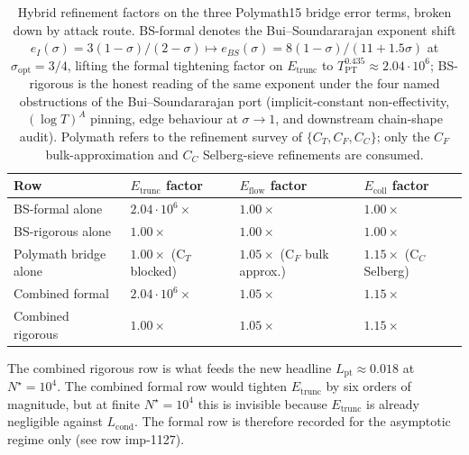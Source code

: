 \documentclass[11pt,a4paper]{article}
\theoremstyle{definition}
\newcommand{\Lpt}{L_{\mathrm{pt}}}
\newcommand{\Etrunc}{E_{\mathrm{trunc}}}
\newcommand{\Eflow}{E_{\mathrm{flow}}}
\newcommand{\Ecoll}{E_{\mathrm{coll}}}
\newcommand{\Nstar}{N^{\!\star}}
\begin{document}
\begin{table}[h]
  \centering
  \small
  \caption{Hybrid refinement factors on the three Polymath15 bridge
    error terms, broken down by attack route. BS-formal denotes the
    Bui--Soundararajan exponent shift
    $e_I(\sigma) = 3(1-\sigma)/(2-\sigma) \mapsto
     e_{BS}(\sigma) = 8(1-\sigma)/(11+1.5\sigma)$ at
    $\sigma_{\mathrm{opt}} = 3/4$, lifting the formal tightening factor
    on $\Etrunc$ to $T_{\mathrm{PT}}^{0.435} \approx 2.04 \cdot 10^{6}$;
    BS-rigorous is the honest reading of the same exponent under the
    four named obstructions of the Bui--Soundararajan port
    (implicit-constant non-effectivity, $(\log T)^A$ pinning, edge
    behaviour at $\sigma \to 1$, and downstream chain-shape audit).
    Polymath refers to the refinement survey of $\{C_T, C_F, C_C\}$;
    only the $C_F$ bulk-approximation and $C_C$ Selberg-sieve
    refinements are consumed.}
  \label{tab:hybrid}
  \begin{tabular}{@{}p{} p{} p{} p{}@{}}
    \toprule
    Row & $\Etrunc$ factor & $\Eflow$ factor & $\Ecoll$ factor \\
    \midrule
    BS-formal alone     & $2.04 \cdot 10^{6}\times$ & $1.00\times$ & $1.00\times$ \\[2pt]
    BS-rigorous alone   & $1.00\times$              & $1.00\times$ & $1.00\times$ \\[2pt]
    Polymath bridge alone
                        & $1.00\times$ (C${}_T$ blocked)
                        & $1.05\times$ (C${}_F$ bulk approx.)
                        & $1.15\times$ (C${}_C$ Selberg) \\[2pt]
    Combined formal     & $2.04 \cdot 10^{6}\times$ & $1.05\times$ & $1.15\times$ \\[2pt]
    Combined rigorous   & $1.00\times$              & $1.05\times$ & $1.15\times$ \\
    \bottomrule
  \end{tabular}
\end{table}

The combined rigorous row is what feeds the new headline
$\Lpt \approx 0.018$ at $\Nstar = 10^{4}$. The combined formal row
would tighten $\Etrunc$ by six orders of magnitude, but at finite
$\Nstar = 10^{4}$ this is invisible because $\Etrunc$ is already
negligible against $L_{\mathrm{cond}}$. The formal row is therefore
recorded for the asymptotic regime only (see
 row imp-1127).
\end{document}
